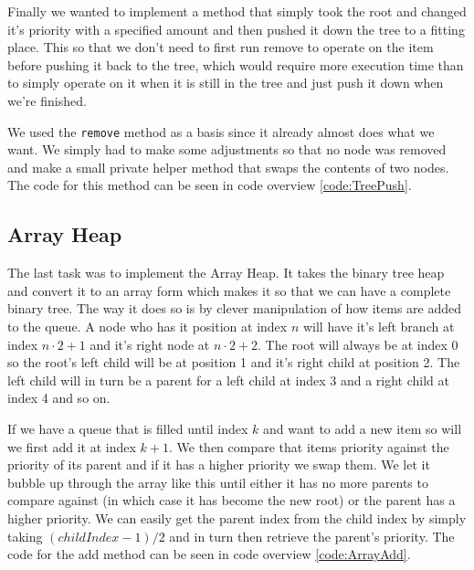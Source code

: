 \documentclass[a4paper,11pt]{article}
\begin{document}
Finally we wanted to implement a method that simply took the root and changed it's priority with a specified 
amount and then pushed it down the tree to a fitting place. This so that we don't need to first run remove to operate 
on the item before pushing it back to the tree, which would require more execution time than to simply operate 
on it when it is still in the tree and just push it down when we're finished. 

We used the {\tt remove} method as a basis since it already almost does what we want. We simply had to make some 
adjustments so that no node was removed and make a small private helper method that swaps the contents of two 
nodes. The code for this method can be seen in code overview \ref{code:TreePush}.

\subsection{Array Heap}
The last task was to implement the Array Heap. It takes the binary tree heap and convert it to an array form which 
makes it so that we can have a complete binary tree. The way it does so is by clever manipulation of how items are 
added to the queue. A node who has it position at index $n$ will have it's left branch at index $n\cdot 2 +1$
and it's right node at $n \cdot 2 + 2$. The root will always be at index 0 so the root's left child will be at 
position 1 and it's right child at position 2. The left child will in turn be a parent for a left child at index 
3 and a right child at index 4 and so on. 

If we have a queue that is filled until index $k$ and want to add a new item so will we first add it at index $k+1$.
We then compare that items priority against the priority of its parent and if it has a higher priority we swap them.
We let it bubble up through the array like this until either it has no more parents to compare against (in which 
case it has become the new root) or the parent has a higher priority. We can easily get the parent index from the
child index by simply taking $(childIndex -1)/2$ and in turn then retrieve the parent's priority. The code for the 
add method can be seen in code overview \ref{code:ArrayAdd}.
\end{document}
